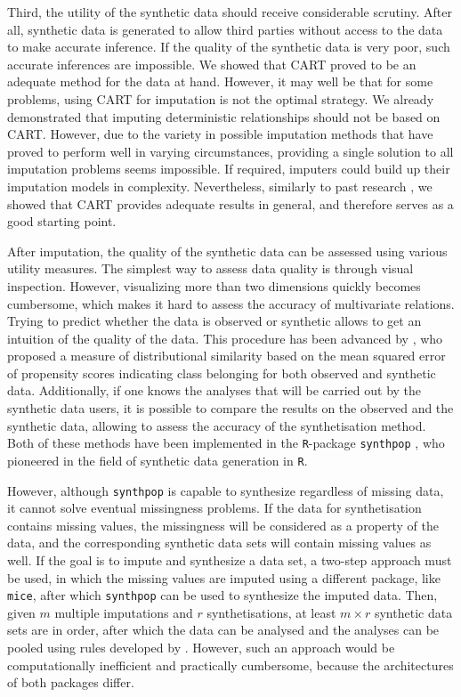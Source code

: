 \documentclass[psych,article,submit,moreauthors,pdftex]{mdpi}
\begin{document}
Third, the utility of the synthetic data should receive considerable
scrutiny. After all, synthetic data is generated to allow third parties
without access to the data to make accurate inference. If the quality of
the synthetic data is very poor, such accurate inferences are
impossible. We showed that CART proved to be an adequate method for the
data at hand. However, it may well be that for some problems, using CART
for imputation is not the optimal strategy. We already demonstrated that
imputing deterministic relationships should not be based on CART.
However, due to the variety in possible imputation methods that have
proved to perform well in varying circumstances, providing a single
solution to all imputation problems seems impossible. If required,
imputers could build up their imputation models in complexity.
Nevertheless, similarly to past research
\citep[e.g.,][]{burgette_reiter_cart_2010, doove_buuren_recursive_2014, raab_practical_2016},
we showed that CART provides adequate results in general, and therefore
serves as a good starting point.

After imputation, the quality of the synthetic data can be assessed
using various utility measures. The simplest way to assess data quality
is through visual inspection. However, visualizing more than two
dimensions quickly becomes cumbersome, which makes it hard to assess the
accuracy of multivariate relations. Trying to predict whether the data
is observed or synthetic allows to get an intuition of the quality of
the data. This procedure has been advanced by \citet{snoke2018general},
who proposed a measure of distributional similarity based on the mean
squared error of propensity scores indicating class belonging for both
observed and synthetic data. Additionally, if one knows the analyses
that will be carried out by the synthetic data users, it is possible to
compare the results on the observed and the synthetic data, allowing to
assess the accuracy of the synthetisation method. Both of these methods
have been implemented in the \texttt{R}-package \texttt{synthpop}
\citep{synthpop}, who pioneered in the field of synthetic data
generation in \texttt{R}.

However, although \texttt{synthpop} is capable to synthesize regardless
of missing data, it cannot solve eventual missingness problems. If the
data for synthetisation contains missing values, the missingness will be
considered as a property of the data, and the corresponding synthetic
data sets will contain missing values as well. If the goal is to impute
and synthesize a data set, a two-step approach must be used, in which
the missing values are imputed using a different package, like
\texttt{mice}, after which \texttt{synthpop} can be used to synthesize
the imputed data. Then, given \(m\) multiple imputations and \(r\)
synthetisations, at least \(m \times r\) synthetic data sets are in
order, after which the data can be analysed and the analyses can be
pooled using rules developed by \citet{reiter2004simultaneous}. However,
such an approach would be computationally inefficient and practically
cumbersome, because the architectures of both packages differ.
\end{document}
